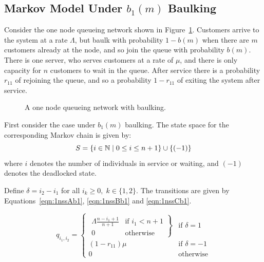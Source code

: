 \documentclass{article}
\begin{document}
\subsection{Markov Model Under $b_1(m)$ Baulking}

Consider the one node queueing network shown in Figure~\ref{fig:onenodenetwork_baulking}.
Customers arrive to the system at a rate $\Lambda$, but baulk with probability $1 - b(m)$ when there are $m$ customers already at the node, and so join the queue with probability $b(m)$.
There is one server, who serves customers at a rate of $\mu$, and there is only capacity for $n$ customers to wait in the queue.
After service there is a probability $r_{11}$ of rejoining the queue, and so a probability $1-r_{11}$ of exiting the system after service.

\begin{figure}[!hbtp]
    \begin{center}
        
    \end{center}
    \caption{A one node queueing network with baulking.}
    \label{fig:onenodenetwork_baulking}
\end{figure}

First consider the case under $b_1(m)$ baulking.
The state space for the corresponding Markov chain is given by:
        \[S = \{i\in\mathbb{N} \nonscript\; | \nonscript\; 0 \leq i \leq n + 1
        \}\cup\{(-1)\}\]
where \(i\) denotes the number of individuals in service or waiting, and $(-1)$ denotes the deadlocked state.

Define  $\delta = i_2 - i_1$ for all $i_k \geq 0,\; k \in \{1, 2\}$.
The transitions are given by Equations~\ref{eqn:1nssAb1}, \ref{eqn:1nssBb1} and \ref{eqn:1nssCb1}.

\begin{equation}\label{eqn:1nssAb1}
  q_{i_1, i_2} = \left\{
  \begin{array}{rr}
    \left. \begin{array}{rr}
      \Lambda \frac{n - i_1 + 1}{n + 1} & \text{if } i_1 < n + 1 \\
      0 & \text{otherwise}
    \end{array} \right\} & \text{if } \delta = 1 \\
    (1 - r_{11})\mu & \text{if } \delta = -1 \\
    0 & \text{otherwise}
  \end{array} \right.
\end{equation}
\end{document}
